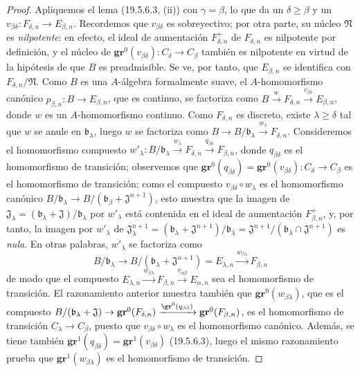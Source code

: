 \begin{proof}
Apliquemos el lema (19.5.6.3, (ii)) con $\gamma=\beta$, lo que da un
$\delta\geq\beta$ y un
$v_{\beta\delta}:F_{\delta,n}\to E_{\beta,n}$. Recordemos que
$v_{\beta\delta}$ es sobreyectivo; por otra parte, su núcleo $\mathfrak N$ es
\emph{nilpotente}: en efecto, el ideal de aumentación $F_{\delta,n}^+$ de
$F_{\delta,n}$ es nilpotente por definición, y el núcleo de
$\mathbf{gr}^0(v_{\beta\delta}):C_\delta\to C_\beta$ también es nilpotente en virtud de
la hipótesis de que $B$ es preadmisible. Se ve, por tanto, que $E_{\beta,n}$
se identifica con $F_{\delta,n}/\mathfrak N$. Como $B$ es una $A$-álgebra
formalmente suave, el $A$-homomorfismo canónico
$p_{\beta,n}:B\to E_{\beta,n}$, que es continuo, se factoriza como
$B\xrightarrow{w}F_{\delta,n}\xrightarrow{v_{\beta\delta}}E_{\beta,n}$, donde
$w$ es un $A$-homomorfismo continuo. Como $F_{\delta,n}$ es discreto, existe
$\lambda\geq\delta$ tal que $w$ se anule en $\mathfrak b_\lambda$, luego $w$
se factoriza como
$B\to B/\mathfrak b_\lambda\xrightarrow{w_\lambda}F_{\delta,n}$. Consideremos
el homomorfismo compuesto
$w'_\lambda:B/\mathfrak b_\lambda\xrightarrow{w_\lambda}F_{\delta,n}
\xrightarrow{q_{\beta\delta}}F_{\beta,n}$, donde $q_{\beta\delta}$ es
el homomorfismo de transición; observemos que
$\mathbf{gr}^0(q_{\beta\delta})=\mathbf{gr}^0(v_{\beta\delta}):C_\delta\to C_\beta$ es
el homomorfismo de transición; como el compuesto
$v_{\beta\delta}\circ w_\lambda$ es el homomorfismo
canónico $B/\mathfrak b_\lambda\to
B/(\mathfrak b_\beta+\mathfrak J^{n+1})$, esto muestra que la imagen de
$\mathfrak J_\lambda=(\mathfrak b_\lambda+\mathfrak J)/\mathfrak b_\lambda$
por $w'_\lambda$ está contenida en el ideal de aumentación
$F_{\beta,n}^+$, y, por tanto, la imagen por $w'_\lambda$ de
$\mathfrak J_\lambda^{n+1}=(\mathfrak b_\lambda+\mathfrak J^{n+1})/
\mathfrak b_\lambda=\mathfrak J^{n+1}/(\mathfrak b_\lambda\cap\mathfrak J^{n+1})$ es \emph{nula}. En otras palabras,
$w'_\lambda$ se factoriza como
\[
  B/\mathfrak b_\lambda\to
  B/(\mathfrak b_\lambda+\mathfrak J^{n+1})=E_{\lambda,n}
  \xrightarrow{w_{\beta\lambda}}F_{\beta,n}
\]
de modo que el compuesto
$E_{\lambda,n}\xrightarrow{w_{\beta\lambda}}F_{\beta,n}
\xrightarrow{v_{\alpha\beta}}E_{\alpha,n}$ sea el homomorfismo de transición.
El razonamiento anterior muestra también que $\mathbf{gr}^0(w_{\beta\lambda})$, que es
el compuesto
$B/(\mathfrak b_\lambda+\mathfrak J)\to\mathbf{gr}^0(F_{\delta,n})
\xrightarrow{\gr^0(q_{\beta\delta})}\mathbf{gr}^0(F_{\beta,n})$, es el homomorfismo
de transición $C_\lambda\to C_\beta$, puesto que
$v_{\beta\delta}\circ w_\lambda$ es el homomorfismo canónico. Además, se tiene también
$\mathbf{gr}^1(q_{\beta\delta})=\mathbf{gr}^1(v_{\beta\delta})$ (19.5.6.3), luego el mismo
razonamiento prueba que $\mathbf{gr}^1(w_{\beta\lambda})$ es el homomorfismo de
transición.
\end{proof}

